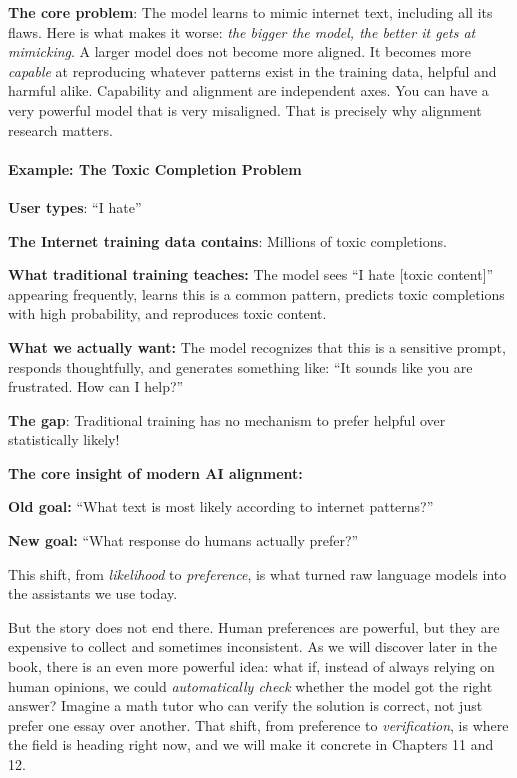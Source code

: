 \begin{chapterenv}
\textbf{The core problem}: The model learns to mimic internet text, including all its flaws. Here is what makes it worse: \textit{the bigger the model, the better it gets at mimicking}. A larger model does not become more aligned. It becomes more \textit{capable} at reproducing whatever patterns exist in the training data, helpful and harmful alike. Capability and alignment are independent axes. You can have a very powerful model that is very misaligned. That is precisely why alignment research matters.

\paragraph{Example: The Toxic Completion Problem}

\textbf{User types}: ``I hate''

\textbf{The Internet training data contains}: Millions of toxic completions.

\textbf{What traditional training teaches:} The model sees ``I hate [toxic content]'' appearing frequently, learns this is a common pattern, predicts toxic completions with high probability, and reproduces toxic content.

\textbf{What we actually want:} The model recognizes that this is a sensitive prompt, responds thoughtfully, and generates something like: ``It sounds like you are frustrated. How can I help?''

\textbf{The gap}: Traditional training has no mechanism to prefer helpful over statistically likely!

\begin{infobox}
\textbf{The core insight of modern AI alignment:}

\textbf{Old goal:} ``What text is most likely according to internet patterns?''

\textbf{New goal:} ``What response do humans actually prefer?''

This shift, from \textit{likelihood} to \textit{preference}, is what turned raw language models into the assistants we use today.

But the story does not end there. Human preferences are powerful, but they are expensive to collect and sometimes inconsistent. As we will discover later in the book, there is an even more powerful idea: what if, instead of always relying on human opinions, we could \textit{automatically check} whether the model got the right answer? Imagine a math tutor who can verify the solution is correct, not just prefer one essay over another. That shift, from preference to \textit{verification}, is where the field is heading right now, and we will make it concrete in Chapters 11 and 12.
\end{infobox}


\end{chapterenv}
